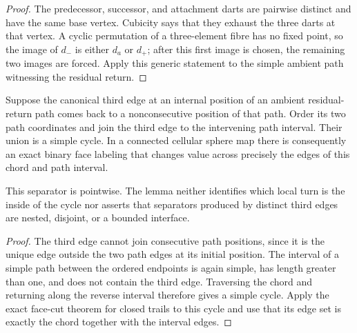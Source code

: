 \begin{proof}
The predecessor, successor, and attachment darts are pairwise distinct and
have the same base vertex.  Cubicity says that they exhaust the three darts
at that vertex.  A cyclic permutation of a three-element fibre has no fixed
point, so the image of $d_-$ is either $d_a$ or $d_+$; after this first image
is chosen, the remaining two images are forced.  Apply this generic statement
to the simple ambient path witnessing the residual return.
\end{proof}

\begin{lemma}
\label{lem:ambient-return-chord-face-separator}
Suppose the canonical third edge at an internal position of an ambient
residual-return path comes back to a nonconsecutive position of that path.
Order its two path coordinates and join the third edge to the intervening path
interval.  Their union is a simple cycle.  In a connected cellular sphere map
there is consequently an exact binary face labeling that changes value across
precisely the edges of this chord and path interval.

This separator is pointwise.  The lemma neither identifies which local turn
is the inside of the cycle nor asserts that separators produced by distinct
third edges are nested, disjoint, or a bounded interface.
\end{lemma}

\begin{proof}
The third edge cannot join consecutive path positions, since it is the unique
edge outside the two path edges at its initial position.  The interval of a
simple path between the ordered endpoints is again simple, has length greater
than one, and does not contain the third edge.  Traversing the chord and
returning along the reverse interval therefore gives a simple cycle.  Apply
the exact face-cut theorem for closed trails to this cycle and use that its
edge set is exactly the chord together with the interval edges.
\end{proof}

